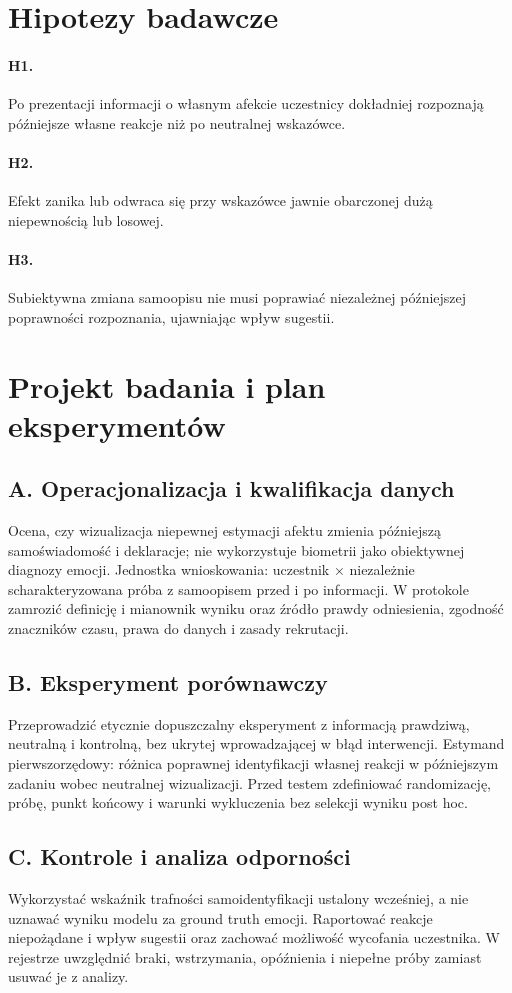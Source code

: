 \documentclass[11pt,a4paper]{article}
\begin{document}
\section{Hipotezy badawcze}
\paragraph{H1.} Po prezentacji informacji o własnym afekcie uczestnicy dokładniej rozpoznają późniejsze własne reakcje niż po neutralnej wskazówce.
\paragraph{H2.} Efekt zanika lub odwraca się przy wskazówce jawnie obarczonej dużą niepewnością lub losowej.
\paragraph{H3.} Subiektywna zmiana samoopisu nie musi poprawiać niezależnej późniejszej poprawności rozpoznania, ujawniając wpływ sugestii.
\section{Projekt badania i plan eksperymentów}
\subsection{A. Operacjonalizacja i kwalifikacja danych}
Ocena, czy wizualizacja niepewnej estymacji afektu zmienia późniejszą samoświadomość i deklaracje; nie wykorzystuje biometrii jako obiektywnej diagnozy emocji. Jednostka wnioskowania: uczestnik × niezależnie scharakteryzowana próba z samoopisem przed i po informacji. W protokole zamrozić definicję i mianownik wyniku oraz źródło prawdy odniesienia, zgodność znaczników czasu, prawa do danych i zasady rekrutacji.
\subsection{B. Eksperyment porównawczy}
Przeprowadzić etycznie dopuszczalny eksperyment z informacją prawdziwą, neutralną i kontrolną, bez ukrytej wprowadzającej w błąd interwencji. Estymand pierwszorzędowy: różnica poprawnej identyfikacji własnej reakcji w późniejszym zadaniu wobec neutralnej wizualizacji. Przed testem zdefiniować randomizację, próbę, punkt końcowy i warunki wykluczenia bez selekcji wyniku post hoc.
\subsection{C. Kontrole i analiza odporności}
Wykorzystać wskaźnik trafności samoidentyfikacji ustalony wcześniej, a nie uznawać wyniku modelu za ground truth emocji. Raportować reakcje niepożądane i wpływ sugestii oraz zachować możliwość wycofania uczestnika. W rejestrze uwzględnić braki, wstrzymania, opóźnienia i niepełne próby zamiast usuwać je z analizy.
\end{document}
